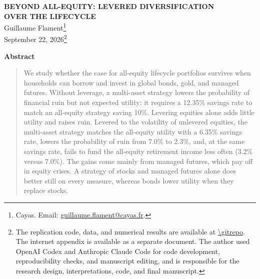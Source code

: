\documentclass[12pt]{article}
\begin{document}
\begin{titlepage}
\begin{center}
{\large\bfseries BEYOND ALL-EQUITY: LEVERED DIVERSIFICATION\\[2pt] OVER THE LIFECYCLE}\\[12pt]
Guillaume Flament\footnote{Cayas. Email: \href{mailto:guillaume.flament@cayas.fr}{guillaume.flament@cayas.fr}.}\\[8pt]
September 22, 2026\footnote{The replication code, data, and numerical results are available at
\url{\gitrepo}. The internet appendix is available as a separate document. The author used OpenAI Codex
and Anthropic Claude Code for code development, reproducibility checks, and manuscript editing, and is
responsible for the research design, interpretations, code, and final manuscript.}
\end{center}
\vspace{6pt}
\begin{center}\textbf{Abstract}\end{center}
\begin{quote}\small
We study whether the case for all-equity lifecycle portfolios survives when households can borrow and
invest in global bonds, gold, and managed futures. Without leverage, a multi-asset strategy lowers the
probability of financial ruin but not expected utility: it requires a 12.35\% savings rate to match an
all-equity strategy saving 10\%. Levering equities alone adds little utility and raises ruin. Levered to
the volatility of unlevered equities, the multi-asset strategy matches the all-equity utility with a
6.35\% savings rate, lowers the probability of ruin from 7.0\% to 2.3\%, and, at the same savings rate,
fails to fund the all-equity retirement income less often (3.2\% versus 7.0\%). The gains come mainly from
managed futures, which pay off in equity crises. A strategy of stocks and managed futures alone does
better still on every measure, whereas bonds lower utility when they replace stocks.


\end{quote}
\end{titlepage}
\end{document}

